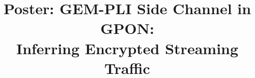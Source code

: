 \documentclass[conference]{IEEEtran}
\begin{document}
\raggedbottom %
%
\title{Poster: GEM-PLI Side Channel in GPON: \\Inferring Encrypted Streaming Traffic}


\author{
	}
	

% 






\end{document}
